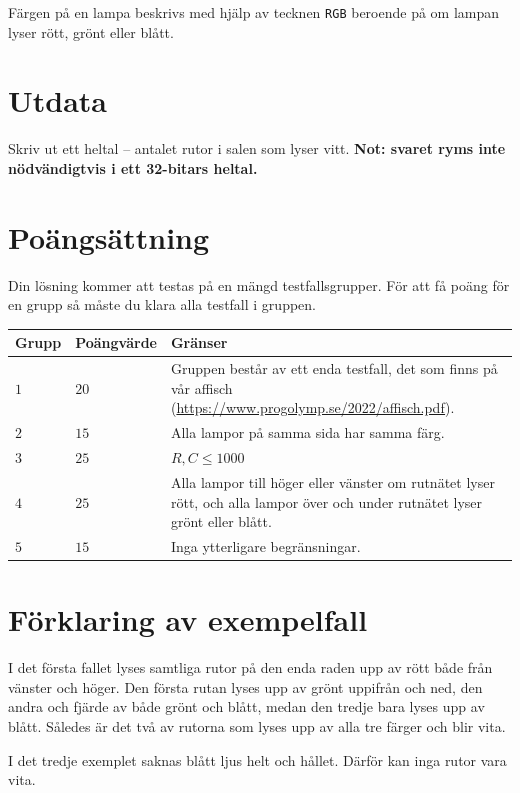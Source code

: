 Färgen på en lampa beskrivs med hjälp av tecknen \texttt{RGB} beroende på om lampan lyser rött, grönt eller blått.

\section*{Utdata}
Skriv ut ett heltal -- antalet rutor i salen som lyser vitt.
\textbf{Not: svaret ryms inte nödvändigtvis i ett 32-bitars heltal.}

\section*{Poängsättning}
Din lösning kommer att testas på en mängd testfallsgrupper.
För att få poäng för en grupp så måste du klara alla testfall i gruppen.

\noindent
\begin{tabular}{| l | l | p{12cm} |}
  \hline
  Grupp & Poängvärde & Gränser \\ \hline
  $1$    & $20$        &  Gruppen består av ett enda testfall, det som finns på vår affisch (\url{https://www.progolymp.se/2022/affisch.pdf}). \\ \hline 
  $2$    & $15$        &  Alla lampor på samma sida har samma färg. \\ \hline
  $3$    & $25$        &  $R,C \le 1000$ \\ \hline 
  $4$    & $25$        &  Alla lampor till höger eller vänster om rutnätet lyser rött, och alla lampor över och under rutnätet lyser grönt eller blått. \\ \hline
  $5$    & $15$        &  Inga ytterligare begränsningar. \\ \hline
\end{tabular}

\section*{Förklaring av exempelfall}
I det första fallet lyses samtliga rutor på den enda raden upp av rött både från vänster och höger.
Den första rutan lyses upp av grönt uppifrån och ned, den andra och fjärde av både grönt och blått, medan den tredje bara lyses upp av blått.
Således är det två av rutorna som lyses upp av alla tre färger och blir vita.

I det tredje exemplet saknas blått ljus helt och hållet.
Därför kan inga rutor vara vita.
